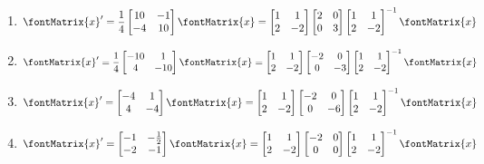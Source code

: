 \begin{enumerate}[label=(\alph*)]
\item\label{itm : Exam4Q2a} $\displaystyle \fontMatrix{x}' = \frac{1}{4} \begin{bmatrix}10&-1\\-4&10\end{bmatrix} \fontMatrix{x} = \begin{bmatrix}1&1\\2&-2\end{bmatrix} \begin{bmatrix}2&0\\0&3\end{bmatrix} \begin{bmatrix}1&1\\2&-2\end{bmatrix}^{-1} \fontMatrix{x}$
\item\label{itm : Exam4Q2b} $\displaystyle \fontMatrix{x}' = \frac{1}{4} \begin{bmatrix}-10&1\\4&-10\end{bmatrix} \fontMatrix{x} = \begin{bmatrix}1&1\\2&-2\end{bmatrix} \begin{bmatrix}-2&0\\0&-3\end{bmatrix} \begin{bmatrix}1&1\\2&-2\end{bmatrix}^{-1} \fontMatrix{x}$
\item\label{itm : Exam4Q2c} $\displaystyle \fontMatrix{x}' = \begin{bmatrix}-4&1\\4&-4\end{bmatrix} \fontMatrix{x} = \begin{bmatrix}1&1\\2&-2\end{bmatrix} \begin{bmatrix}-2&0\\0&-6\end{bmatrix} \begin{bmatrix}1&1\\2&-2\end{bmatrix}^{-1} \fontMatrix{x}$
\item\label{itm : Exam4Q2d} $\displaystyle \fontMatrix{x}' = \begin{bmatrix}-1&-\frac{1}{2}\\-2&-1\end{bmatrix} \fontMatrix{x} = \begin{bmatrix}1&1\\2&-2\end{bmatrix} \begin{bmatrix}-2&0\\0&0\end{bmatrix} \begin{bmatrix}1&1\\2&-2\end{bmatrix}^{-1} \fontMatrix{x}$

\end{enumerate}
